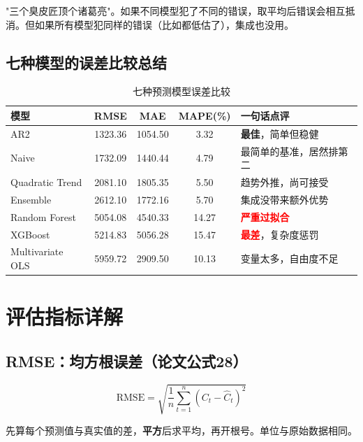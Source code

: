 \documentclass[12pt, a4paper]{article}
\begin{document}
\begin{tipbox}[集成的逻辑]
"三个臭皮匠顶个诸葛亮"。如果不同模型犯了不同的错误，取平均后错误会相互抵消。但如果所有模型犯同样的错误（比如都低估了），集成也没用。
\end{tipbox}

\subsection{七种模型的误差比较总结}

\begin{table}[H]
\centering
\small
\begin{tabularx}{\textwidth}{lcccX}
\toprule
\textbf{模型} & \textbf{RMSE} & \textbf{MAE} & \textbf{MAPE(\%)} & \textbf{一句话点评} \\
\midrule
AR2 & 1323.36 & 1054.50 & 3.32 & \textcolor{green!60!black}{\textbf{最佳}}，简单但稳健 \\
Naive & 1732.09 & 1440.44 & 4.79 & 最简单的基准，居然排第二 \\
Quadratic Trend & 2081.10 & 1805.35 & 5.50 & 趋势外推，尚可接受 \\
Ensemble & 2612.10 & 1772.16 & 5.70 & 集成没带来额外优势 \\
Random Forest & 5054.08 & 4540.33 & 14.27 & \textcolor{red}{\textbf{严重过拟合}} \\
XGBoost & 5214.83 & 5056.28 & 15.47 & \textcolor{red}{\textbf{最差}}，复杂度惩罚 \\
Multivariate OLS & 5959.72 & 2909.50 & 10.13 & 变量太多，自由度不足 \\
\bottomrule
\end{tabularx}
\caption{七种预测模型误差比较}
\end{table}

\section{评估指标详解}

\subsection{RMSE：均方根误差（论文公式28）}

\[
\text{RMSE} = \sqrt{\frac{1}{n}\sum_{t=1}^{n}(C_t - \hat{C}_t)^2}
\]

\begin{conceptbox}[RMSE]
先算每个预测值与真实值的差，\textbf{平方}后求平均，再开根号。单位与原始数据相同。
\end{conceptbox}
\end{document}
